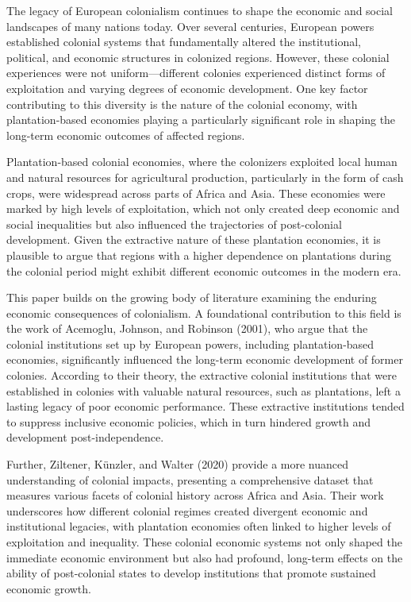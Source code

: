 \documentclass[12pt]{article}
\begin{document}
\vspace{0.5in}
The legacy of European colonialism continues to shape the economic and social landscapes of many nations today. Over several centuries, European powers established colonial systems that fundamentally altered the institutional, political, and economic structures in colonized regions. However, these colonial experiences were not uniform—different colonies experienced distinct forms of exploitation and varying degrees of economic development. One key factor contributing to this diversity is the nature of the colonial economy, with plantation-based economies playing a particularly significant role in shaping the long-term economic outcomes of affected regions.

\noindent Plantation-based colonial economies, where the colonizers exploited local human and natural resources for agricultural production, particularly in the form of cash crops, were widespread across parts of Africa and Asia. These economies were marked by high levels of exploitation, which not only created deep economic and social inequalities but also influenced the trajectories of post-colonial development. Given the extractive nature of these plantation economies, it is plausible to argue that regions with a higher dependence on plantations during the colonial period might exhibit different economic outcomes in the modern era.

\vspace{0.2in}
\noindent This paper builds on the growing body of literature examining the enduring economic consequences of colonialism. A foundational contribution to this field is the work of Acemoglu, Johnson, and Robinson (2001), who argue that the colonial institutions set up by European powers, including plantation-based economies, significantly influenced the long-term economic development of former colonies. According to their theory, the extractive colonial institutions that were established in colonies with valuable natural resources, such as plantations, left a lasting legacy of poor economic performance. These extractive institutions tended to suppress inclusive economic policies, which in turn hindered growth and development post-independence.

\noindent Further, Ziltener, Künzler, and Walter (2020) provide a more nuanced understanding of colonial impacts, presenting a comprehensive dataset that measures various facets of colonial history across Africa and Asia. Their work underscores how different colonial regimes created divergent economic and institutional legacies, with plantation economies often linked to higher levels of exploitation and inequality. These colonial economic systems not only shaped the immediate economic environment but also had profound, long-term effects on the ability of post-colonial states to develop institutions that promote sustained economic growth.
\end{document}
